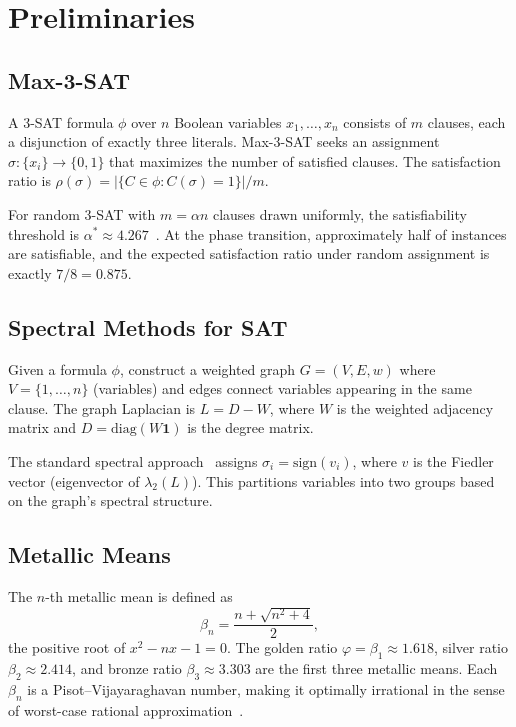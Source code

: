 \documentclass[11pt,a4paper]{article}
\begin{document}
\section{Preliminaries}

\subsection{Max-3-SAT}

A 3-SAT formula $\phi$ over $n$ Boolean variables $x_1, \ldots, x_n$
consists of $m$ clauses, each a disjunction of exactly three literals.
Max-3-SAT seeks an assignment $\sigma : \{x_i\} \to \{0,1\}$ that
maximizes the number of satisfied clauses. The satisfaction ratio is
$\rho(\sigma) = |\{C \in \phi : C(\sigma) = 1\}| / m$.

For random 3-SAT with $m = \alpha n$ clauses drawn uniformly, the
satisfiability threshold is $\alpha^* \approx 4.267$~\cite{ding2015proof}.
At the phase transition, approximately half of instances are
satisfiable, and the expected satisfaction ratio under random assignment
is exactly $7/8 = 0.875$.

\subsection{Spectral Methods for SAT}

Given a formula $\phi$, construct a weighted graph $G = (V, E, w)$
where $V = \{1, \ldots, n\}$ (variables) and edges connect variables
appearing in the same clause. The graph Laplacian is $L = D - W$,
where $W$ is the weighted adjacency matrix and $D = \text{diag}(W\mathbf{1})$
is the degree matrix.

The standard spectral approach~\cite{alaoui2014spectral} assigns
$\sigma_i = \text{sign}(v_i)$, where $v$ is the Fiedler vector
(eigenvector of $\lambda_2(L)$). This partitions variables into two
groups based on the graph's spectral structure.

\subsection{Metallic Means}

The $n$-th metallic mean is defined as
\begin{equation}
\beta_n = \frac{n + \sqrt{n^2 + 4}}{2},
\end{equation}
the positive root of $x^2 - nx - 1 = 0$. The golden ratio
$\varphi = \beta_1 \approx 1.618$, silver ratio $\beta_2 \approx 2.414$,
and bronze ratio $\beta_3 \approx 3.303$ are the first three metallic
means. Each $\beta_n$ is a Pisot--Vijayaraghavan number, making it
optimally irrational in the sense of worst-case rational
approximation~\cite{adamczewski2007pisot}.
\end{document}
